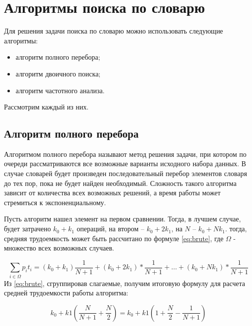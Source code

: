 \documentclass[12pt]{report}
\begin{document}
    \section{Алгоритмы поиска по словарю}
    
    Для решения задачи поиска по словарю можно использовать следующие алгоритмы:
    \begin{itemize}
    	\item алгоритм полного перебора;
    	\item алгоритм двоичного поиска;
    	\item алгоритм частотного анализа.
    \end{itemize}
    
    Рассмотрим каждый из них.
    
    \subsection{Алгоритм полного перебора}
    
    Алгоритмом полного перебора называют метод решения задачи, при котором по очереди рассматриваются все возможные варианты исходного набора данных. В случае словарей будет произведен последовательный перебор элементов словаря до тех пор, пока не будет найден необходимый. Сложность такого алгоритма зависит от количества всех возможных решений, а время работы может стремиться к экспоненциальному.
    
    Пусть алгоритм нашел элемент на первом сравнении. Тогда, в лучшем случае, будет затрачено $k_0 + k_1$ операций, на втором -- $k_0 + 2k_1$, на $N$ -- $k_0 + Nk_1$. тогда, средняя трудоемкость может быть рассчитано по формуле \eqref{eq:brute}, где $\Omega$ - множество всех возможных случаев.
    
    \begin{equation}
    	\label{eq:brute}
    	\sum_{i \in \Omega} p_i t_i = (k_0 + k_1) \frac{1}{N + 1} + (k_0 + 2k_1) * \frac{1}{N + 1} + \dots + (k_0 + Nk_1) * \frac{1}{N + 1} 
    \end{equation}
    Из \eqref{eq:brute}, сгруппировав слагаемые, получим итоговую формулу для расчета средней трудоемкости работы алгоритма:
    
    \begin{equation}
    	k_0 + k1(\frac{N}{N + 1} + \frac{N}{2}) = k_0 + k1(1 + \frac{N}{2} - \frac{1}{N + 1}) 
    \end{equation}
    
\end{document}
